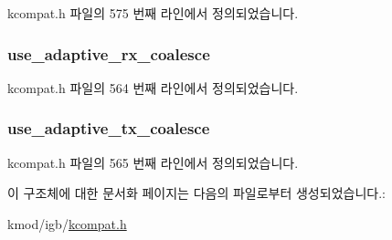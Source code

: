 kcompat.\+h 파일의 575 번째 라인에서 정의되었습니다.

\subsubsection[{\texorpdfstring{use\+\_\+adaptive\+\_\+rx\+\_\+coalesce}{use_adaptive_rx_coalesce}}]{ use\+\_\+adaptive\+\_\+rx\+\_\+coalesce}\hypertarget{struct__kc__ethtool__coalesce_aeb83e036868e69a26d6811b1305aa23e}{}\label{struct__kc__ethtool__coalesce_aeb83e036868e69a26d6811b1305aa23e}


kcompat.\+h 파일의 564 번째 라인에서 정의되었습니다.

\subsubsection[{\texorpdfstring{use\+\_\+adaptive\+\_\+tx\+\_\+coalesce}{use_adaptive_tx_coalesce}}]{ use\+\_\+adaptive\+\_\+tx\+\_\+coalesce}\hypertarget{struct__kc__ethtool__coalesce_acfd26d0701b5c6c601bd75ff89f81b9c}{}\label{struct__kc__ethtool__coalesce_acfd26d0701b5c6c601bd75ff89f81b9c}


kcompat.\+h 파일의 565 번째 라인에서 정의되었습니다.



이 구조체에 대한 문서화 페이지는 다음의 파일로부터 생성되었습니다.\+:\begin{DoxyCompactItemize}
\item 
kmod/igb/\hyperlink{kcompat_8h}{kcompat.\+h}\end{DoxyCompactItemize}
